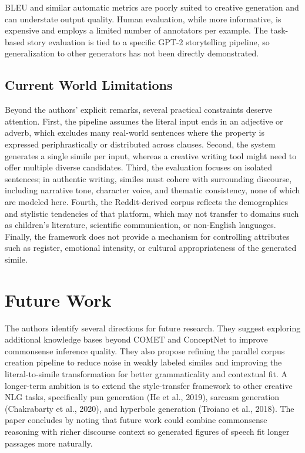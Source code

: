 \documentclass[12pt]{article}
\begin{document}
BLEU and similar automatic metrics are poorly suited to creative generation and can understate output quality. Human evaluation, while more informative, is expensive and employs a limited number of annotators per example. The task-based story evaluation is tied to a specific GPT-2 storytelling pipeline, so generalization to other generators has not been directly demonstrated.

\subsection{Current World Limitations}

Beyond the authors' explicit remarks, several practical constraints deserve attention. First, the pipeline assumes the literal input ends in an adjective or adverb, which excludes many real-world sentences where the property is expressed periphrastically or distributed across clauses. Second, the system generates a single simile per input, whereas a creative writing tool might need to offer multiple diverse candidates. Third, the evaluation focuses on isolated sentences; in authentic writing, similes must cohere with surrounding discourse, including narrative tone, character voice, and thematic consistency, none of which are modeled here. Fourth, the Reddit-derived corpus reflects the demographics and stylistic tendencies of that platform, which may not transfer to domains such as children's literature, scientific communication, or non-English languages. Finally, the framework does not provide a mechanism for controlling attributes such as register, emotional intensity, or cultural appropriateness of the generated simile.

\section{Future Work}

The authors identify several directions for future research. They suggest exploring additional knowledge bases beyond COMET and ConceptNet to improve commonsense inference quality. They also propose refining the parallel corpus creation pipeline to reduce noise in weakly labeled similes and improving the literal-to-simile transformation for better grammaticality and contextual fit. A longer-term ambition is to extend the style-transfer framework to other creative NLG tasks, specifically pun generation (He et al., 2019), sarcasm generation (Chakrabarty et al., 2020), and hyperbole generation (Troiano et al., 2018). The paper concludes by noting that future work could combine commonsense reasoning with richer discourse context so generated figures of speech fit longer passages more naturally.
\end{document}
